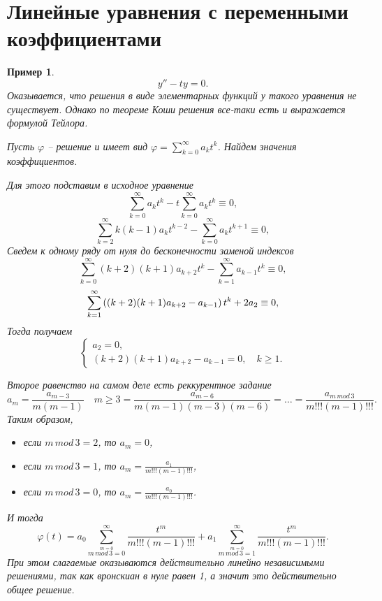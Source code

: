\documentclass[a5paper, 11pt]{article}
\theoremstyle{definition}
\theoremstyle{plain}
\newtheorem{Ex}{Пример}
\theoremstyle{remark}
\begin{document}
	\section[10.03.2023]{Линейные уравнения с переменными коэффициентами}
	\begin{Ex}
		\[
		y''-ty=0.
		\]
		Оказывается, что решения в виде элементарных функций у такого уравнения не существует. Однако по теореме Коши решения все-таки есть и выражается формулой Тейлора.
		
		Пусть $\varphi$ -- решение и имеет вид $\varphi = \sum\limits_{k=0}^{\infty} a_k t^k$. Найдем значения коэффициентов.
		
		Для этого подставим в исходное уравнение
		\[
		\sum\limits_{k=0}^{\infty} a_k t^k - t \sum\limits_{k=0}^{\infty} a_k t^k \equiv 0,
		\]
		\[
		\sum\limits_{k=2}^{\infty} k(k-1) a_k t^{k-2} - \sum\limits_{k=0}^{\infty} a_k t^{k+1} \equiv 0,
		\]
		Сведем к одному ряду от нуля до бесконечности заменой индексов
		\[
			\sum\limits_{k=0}^{\infty} (k+2)(k+1)a_{k+2} t^k - \sum\limits_{k=1}^{\infty} a_{k-1} t^k \equiv 0,
		\]
		\[
		\sum\limits_{k=1}^{\infty} \left((k+2)(k+1)a_{k+2} - a_{k-1}\right) t^k + 2a_2 \equiv 0,
		\]
		Тогда получаем 
		\[
		\begin{cases}
			a_2 = 0,\\
			(k+2)(k+1)a_{k+2} - a_{k-1} = 0, \quad k\geqslant 1.
		\end{cases}
		\]
		
		Второе равенство на самом деле есть реккурентное задание 
		\[
		a_m = \frac{a_{m-3}}{m(m-1)} \quad m\geqslant 3 = \frac{a_{m-6}}{m(m-1)(m-3)(m-6)} = \dots = \frac{a_{m \, mod \, 3}}{m!!! (m-1)!!!}.
		\]
		Таким образом,
		\begin{itemize}
			\item если $m\,mod\, 3 = 2$, то $a_m = 0$,
			\item если $m\,mod\, 3 = 1$, то $a_m = \frac{a_{1}}{m!!! (m-1)!!!}$,
			\item если $m\,mod\, 3 = 0$, то $a_m = \frac{a_{0}}{m!!! (m-1)!!!}$.
		\end{itemize}
		И тогда 
		\[
		\varphi(t) = a_0\sum\limits_{\stackrel{m=0}{m \,mod\,3=0}}^\infty \frac{t^m}{m!!!(m-1)!!!} + a_1\sum\limits_{\stackrel{m=0}{m \,mod\,3=1}}^\infty \frac{t^m}{m!!!(m-1)!!!}.
		\]
		При этом слагаемые оказываются действительно линейно независимыми решениями, так как вронскиан в нуле равен 1, а значит это действительно общее решение. 
	\end{Ex}
\end{document}
